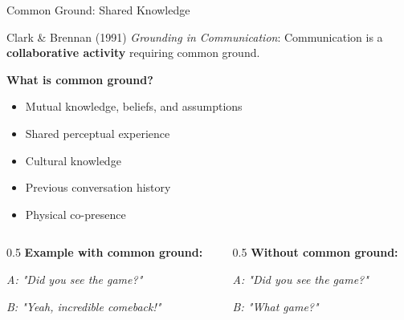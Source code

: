 \documentclass[aspectratio=169]{beamer}
\begin{document}
\begin{frame}{Common Ground: Shared Knowledge 🤝}
\small
    \begin{block}{Clark \& Brennan (1991)}
        \textit{Grounding in Communication}: Communication is a \textbf{collaborative activity} requiring common ground.
    \end{block}

    \vspace{0.3cm}

    \textbf{What is common ground?}
    \begin{itemize}\setlength{\itemsep}{0pt}
        \item Mutual knowledge, beliefs, and assumptions
        \item Shared perceptual experience
        \item Cultural knowledge
        \item Previous conversation history
        \item Physical co-presence
    \end{itemize}

    \vspace{0.3cm}

    \begin{columns}[T]
        \begin{column}{0.5\textwidth}
            \textbf{Example with common ground:}

            \textit{A: "Did you see the game?"}

            \textit{B: "Yeah, incredible comeback!"}
        \end{column}

        \begin{column}{0.5\textwidth}
            \textbf{Without common ground:}

            \textit{A: "Did you see the game?"}

            \textit{B: "What game?"}
        \end{column}
    \end{columns}
\end{frame}
\end{document}
